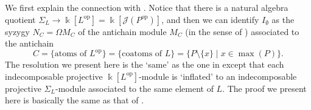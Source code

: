 \documentclass[a4paper,leqno]{amsart}
\begin{document}
We first explain the connection with \cite[Theorem~2.2]{IM22}.  
Notice that there is a natural algebra quotient $\Sigma_L\to \Bbbk[L^{\operatorname{op}}]=\Bbbk[\mathcal{J}(P^{\operatorname{op}})]$, and then we can identify $I_{\emptyset}$ as the syzygy $N_C=\Omega M_C$ of the antichain module $M_C$ (in the sense of \cite{IM22}) associated to the antichain 
\[C=\{\text{atoms of $L^{\operatorname{op}}$}\}=\{\text{coatoms of $L$}\}=\{P\setminus \{x\}\mid x\in\max(P)\}.\]
The resolution we present here is the `same' as  the one in \cite[Theorem~2.2]{IM22} except that each indecomposable projective $\Bbbk[L^{\operatorname{op}}]$-module is `inflated' to an indecomposable projective $\Sigma_L$-module associated to the same element of $L$.
The proof we present here is basically the same as that of \cite[Theorem~2.2]{IM22}.

\end{document}
